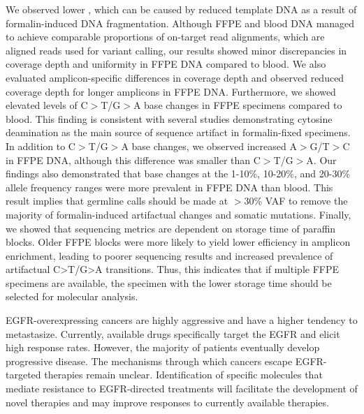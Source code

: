 We observed lower , which can be caused by reduced template DNA as a result of formalin-induced DNA fragmentation. Although FFPE and blood DNA managed to achieve comparable proportions of on-target read alignments, which are aligned reads used for variant calling, our results showed minor discrepancies in coverage depth and uniformity in FFPE DNA compared to blood. We also evaluated amplicon-specific differences in coverage depth and observed reduced coverage depth for longer amplicons in FFPE DNA. Furthermore, we showed elevated levels of C$>$T/G$>$A base changes in FFPE specimens compared to blood. This finding is consistent with several studies demonstrating cytosine deamination as the main source of sequence artifact in formalin-fixed specimens. In addition to C$>$T/G$>$A base changes, we observed increased A$>$G/T$>$C in FFPE DNA, although this difference was smaller than C$>$T/G$>$A. Our findings also demonstrated that base changes at the 1-10\%, 10-20\%, and 20-30\% allele frequency ranges were more prevalent in FFPE DNA than blood. This result implies that germline calls should be made at $>$30\% VAF to remove the majority of formalin-induced artifactual changes and somatic mutations. Finally, we showed that sequencing metrics are dependent on storage time of paraffin blocks. Older FFPE blocks were more likely to yield lower efficiency in amplicon enrichment, leading to poorer sequencing results and increased prevalence of artifactual C>T/G>A transitions. Thus, this indicates that if multiple FFPE specimens are available, the specimen with the lower storage time should be selected for molecular analysis.



EGFR-overexpressing cancers are highly aggressive and have a higher tendency to metastasize. Currently, available drugs specifically target the EGFR and elicit high response rates. However, the majority of patients eventually develop progressive disease. The mechanisms through which cancers escape EGFR-targeted therapies remain unclear. Identification of specific molecules that mediate resistance to EGFR-directed treatments will facilitate the development of novel therapies and may improve responses to currently available therapies.

